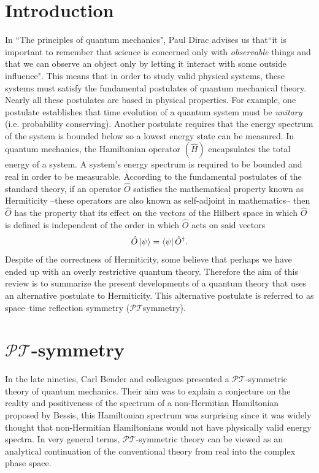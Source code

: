 \documentclass[12pt, a4paper]{report}
\newcommand\PT{\(\mathcal{PT}\)}
\begin{document}
\tableofcontents %

\chapter{Introduction}\label{Introduction}
In ``The principles of quantum mechanics", Paul Dirac advises us that``it is important to remember that science is concerned only with \textit{observable} things and that we can observe an object only by letting it interact with some outside influence"\cite{POQM}. This means that in order to study valid physical systems, these systems must satisfy the fundamental postulates of quantum mechanical theory. Nearly all these postulates are based in physical properties. For example, one postulate establishes that time evolution of a quantum system must be \textit{unitary} (i.e. probability conserving). Another postulate requires that the energy spectrum of the system is bounded below so a lowest energy state can be measured. In quantum mechanics, the Hamiltonian operator $(\hat{H})$ encapsulates the total energy of a system. A system's energy spectrum is required to be bounded and real in order to be measurable. According to the fundamental postulates of the standard theory, if an operator $\hat{O}$ satisfies the mathematical property known as Hermiticity --these operators are also known as self-adjoint in mathematics-- then $\hat{O}$  has the property that its effect on the vectors of the Hilbert space in which $\hat{O}$ is defined is independent of the order in which $\hat{O}$ acts on said vectors\cite{Jones-Smith}
\begin{equation}\label{eq:1.1}
\hat{O}\ket{\psi} = \bra{\psi}\hat{O}^{\dagger}.
\end{equation}
Despite of the correctness of Hermiticity, some believe that perhaps we have ended up with an overly restrictive quantum theory. Therefore the aim of this review is to summarize the present developments of a quantum theory that uses an alternative postulate to Hermiticity. This alternative postulate is referred to as space–time reflection symmetry (\PT\:symmetry)\cite{MustaHbeHermitian}. 


\chapter{\texorpdfstring{$\mathcal{PT}$}\:-symmetry}\label{PT}
In the late nineties, Carl Bender and colleagues presented a \PT-symmetric theory of quantum mechanics. Their aim was to explain a conjecture on the reality and positiveness of the spectrum of a non-Hermitian Hamiltonian proposed by Bessis\cite{RealSpectrainNHH}, this Hamiltonian spectrum was surprising since it was widely thought that non-Hermitian Hamiltonians would not have physically valid energy spectra. In very general terms, \PT-symmetric theory can be viewed as an analytical continuation of the conventional theory from real into the complex phase space\cite{PTsymmetricQM}.
\end{document}
